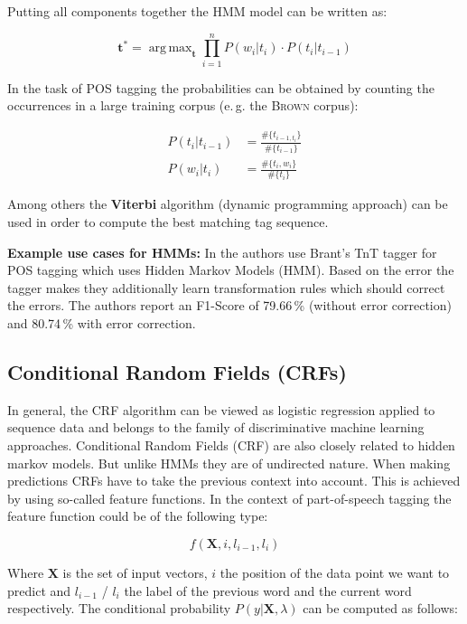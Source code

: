 \documentclass[twocolumns]{IEEEtran}
\DeclareMathOperator*{\argmax}{arg\,max}
\begin{document}
Putting all components together the HMM model can be written as:

\begin{equation*}
    \bm{t}^* = \argmax_{\bm{t}} \prod_{i=1}^n P(w_i \vert t_i)
        \cdot P(t_i \vert t_{i-1})
\end{equation*}

In the task of POS tagging the probabilities can be obtained by counting the occurrences in a large training corpus (e.\,g. the \textsc{Brown} corpus):

\begin{align*}
    P(t_i \vert t_{i-1})    &= \frac{\#\{t_{i-1, t_i}\}}{\#\{t_{i-1}\}} \\[2mm]
    P(w_i \vert t_i)        &= \frac{\#\{t_i, w_i\}}{\#\{t_i\}}
\end{align*}

Among others the \textbf{Viterbi} algorithm (dynamic programming approach) can be used in order to compute the best matching tag sequence.

\vspace*{3mm}
\textbf{Example use cases for HMMs:} In \cite{Awasthi2006} the authors use Brant's TnT tagger \cite{Brants:2000:TSP:974147.974178} for POS tagging which uses Hidden Markov Models (HMM). Based on the error the tagger makes they additionally learn transformation rules which should correct the errors. 
The authors report an F1-Score of 79.66\,\% (without error correction) and 80.74\,\% with error correction. 

\subsection{Conditional Random Fields (CRFs)}
In general, the CRF algorithm can be viewed as logistic regression applied to sequence data and belongs to the family of discriminative machine learning approaches. Conditional Random Fields (CRF) are also closely related to hidden markov models. But unlike HMMs they are of undirected nature. \cite{Sutton:2012} When making predictions CRFs have to take the previous context into account. This is achieved by using so-called feature functions. In the context of part-of-speech tagging the feature function could be of the following type:

\begin{equation*}
    f(\bm{X}, i, l_{i-1}, l_i)
\end{equation*}

Where $\bm{X}$ is the set of input vectors, $i$ the position of the data point we want to predict and $l_{i-1}$ / $l_i$ the label of the previous word and the current word respectively. The conditional probability $P(y \vert \bm{X}, \lambda)$ can be computed as follows:
\end{document}
